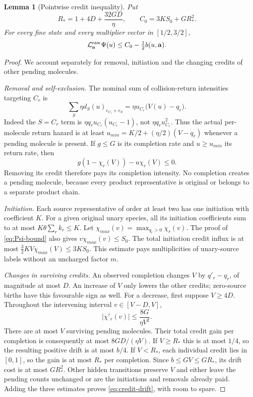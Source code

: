 \documentclass[11pt,reqno]{amsart}
\newtheorem{lemma}[theorem]{Lemma}
\theoremstyle{definition}
\theoremstyle{remark}
\begin{document}
\begin{lemma}[Pointwise credit inequality]\label{lem:credit}
Put
\begin{equation}\label{eq:credit-constants}
 R_*=1+4D+\frac{32GD}{\eta},\qquad C_0=3KS_0+GR_*^2.
\end{equation}
For every fine state and every multiplier vector in $[1/2,3/2]$,
\begin{equation}\label{eq:credit-drift}
 \mathcal L^{\rm raw}_{\mathbf a}\Psi(u)
 \le C_0-\tfrac12 b(u,\mathbf a).
\end{equation}
\end{lemma}
\begin{proof}
We account separately for removal, initiation and the changing credits of
other pending molecules.

\emph{Removal and self-exclusion.}
The nominal sum of collision-return intensities targeting $C_r$ is
\begin{equation}\label{eq:collision-hazard}
 \sum_S\eta d_S (u)_{e_{C_r}+e_S}
 =\eta u_{C_r}\bigl(V(u)-q_r\bigr).
\end{equation}
Indeed the $S=C_r$ term is $\eta q_r u_{C_r}(u_{C_r}-1)$, not
$\eta q_r u_{C_r}^2$. Thus the actual per-molecule return hazard is at least
$u_{min}=K/2+(\eta/2)(V-q_r)$ whenever a pending molecule is present.
If $g\le G$ is its completion rate and $u\ge u_{min}$ its return rate, then
\[
 g(1-\chi_r(V))-u\chi_r(V)\le0.
\]
Removing its credit therefore pays its completion intensity. No completion
creates a pending molecule, because every product representative is original
or belongs to a separate product chain.

\emph{Initiation.}
Each source representative of order at least two has one initiation with
coefficient $K$. For a given original unary species, all its initiation
coefficients sum to at most $K\theta\sum_r k_r\le K$.
Let $\chi_{max}(v)=\max_{q_r>0}\chi_r(v)$. The proof of
\eqref{eq:Psi-bound} also gives $v\chi_{max}(v)\le S_0$.
The total initiation credit influx is at most
$\tfrac32 K V\chi_{max}(V)\le3KS_0$. This estimate pays multiplicities of
unary-source labels without an uncharged factor $m$.

\emph{Changes in surviving credits.}
An observed completion changes $V$ by $q'_r-q_r$, of magnitude at most $D$.
An increase of $V$ only lowers the other credits; zero-source births have this
favourable sign as well. For a decrease, first suppose $V\ge4D$.
Throughout the intervening interval $v\in[V-D,V]$,
\[
 |\chi'_r(v)|\le\frac{8G}{\eta V^2}.
\]
There are at most $V$ surviving pending molecules. Their total credit gain per
completion is consequently at most $8GD/(\eta V)$. If $V\ge R_*$ this is at
most $1/4$, so the resulting positive drift is at most $b/4$.
If $V<R_*$, each individual credit lies in $[0,1]$, so the gain is at most
$R_*$ per completion. Since $b\le GV\le GR_*$, its drift cost is at most
$GR_*^2$. Other hidden transitions preserve $V$ and either leave the pending
counts unchanged or are the initiations and removals already paid.
Adding the three estimates proves \eqref{eq:credit-drift}, with room to spare.
\end{proof}
\end{document}
